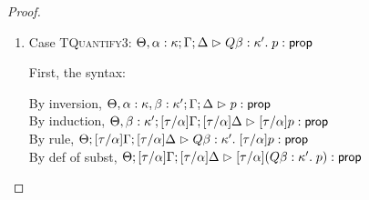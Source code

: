 \begin{proof}
\begin{enumerate}
  For semantics, consider
  $\interp{\judgeA[\Theta; {[\tau/\alpha]}\Gamma; {[\tau/\alpha]}\Delta]
                  {{[\tau/\alpha]}(Q x:A.\;p)}{\assert}}\;\theta\;\gamma\;\delta$ 
  \begin{eqnproof}
          {Semantics}
          {Induction}
          {Semantics}
  \end{eqnproof}

  The correctness of the application of $\gamma$ and $\delta$ follows from the equations for
  contexts under substitution.

\item Case \textsc{TQuantify3}: $\judgeA[\Theta, \alpha:\kappa; \Gamma; \Delta]{Q \beta:\kappa'.\;p}{\assert}$
  
  First, the syntax:
  \begin{tabbedproof}
    \oo By inversion, $\judgeA[\Theta, \alpha:\kappa, \beta:\kappa'; \Gamma; \Delta]{p}{\assert}$ \\
    \oo By induction, $\judgeA[\Theta, \beta:\kappa'; {[\tau/\alpha]}\Gamma; {[\tau/\alpha]}\Delta]{{[\tau/\alpha]}p}{\assert}$ \\
    \oo By rule, $\judgeA[\Theta; {[\tau/\alpha]}\Gamma; {[\tau/\alpha]}\Delta]
                         {Q \beta:\kappa'.\;{[\tau/\alpha]}p}{\assert}$ \\
    \oo By def of subst, $\judgeA[\Theta; {[\tau/\alpha]}\Gamma; {[\tau/\alpha]}\Delta]
                                 {{[\tau/\alpha]}(Q \beta:\kappa'.\;p)}{\assert}$ 
  \end{tabbedproof}


\end{enumerate}
\end{proof}
